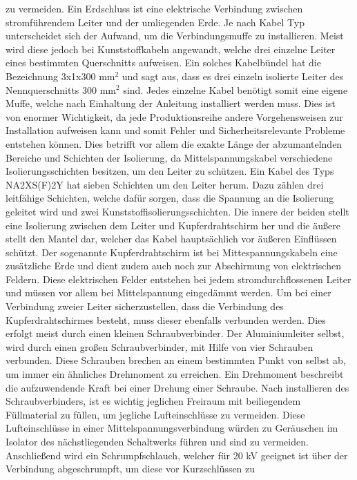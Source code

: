 zu vermeiden. Ein Erdschluss ist eine elektrische Verbindung zwischen stromführendem Leiter und der umliegenden Erde. Je nach Kabel Typ unterscheidet sich der 
Aufwand, um die Verbindungsmuffe zu installieren. Meist wird diese jedoch bei Kunststoffkabeln angewandt, welche drei einzelne Leiter eines bestimmten 
Querschnitts aufweisen. Ein solches Kabelbündel hat die Bezeichnung 3x1x300 mm$^2$ und sagt aus, dass es drei einzeln isolierte Leiter des Nennquerschnitts 
300 mm$^2$ sind. %
Jedes einzelne Kabel benötigt somit eine eigene Muffe, welche nach Einhaltung der Anleitung installiert werden muss. Dies ist von enormer Wichtigkeit, da jede 
Produktionsreihe andere Vorgehensweisen zur Installation aufweisen kann und somit Fehler und Sicherheitsrelevante Probleme entstehen können. Dies betrifft 
vor allem die exakte Länge der abzumantelnden Bereiche und Schichten der Isolierung, da Mittelspannungskabel verschiedene Isolierungsschichten besitzen, um 
den Leiter zu schützen. Ein Kabel des Typs NA2XS(F)2Y hat \zB sieben Schichten um den Leiter herum. Dazu zählen drei leitfähige Schichten, welche dafür 
sorgen, dass die Spannung an die Isolierung geleitet wird und zwei Kunststoffisolierungsschichten. Die innere der beiden stellt eine Isolierung zwischen dem 
Leiter und Kupferdrahtschirm her und die äußere stellt den Mantel dar, welcher das Kabel hauptsächlich vor äußeren Einflüssen schützt. Der sogenannte 
Kupferdrahtschirm ist bei Mittespannungskabeln eine zusätzliche Erde und dient zudem auch noch zur Abschirmung von elektrischen Feldern. \autocite{NKT_NA2XSF2Y}
Diese elektrischen Felder 
entstehen bei jedem stromdurchflossenen Leiter und müssen vor allem bei Mittelspannung eingedämmt werden. Um bei einer Verbindung zweier Leiter 
sicherzustellen, dass die Verbindung des Kupferdrahtschirmes besteht, muss dieser ebenfalls verbunden werden. Dies erfolgt meist durch einen kleinen 
Schraubverbinder. Der Aluminiumleiter selbst, wird durch einen großen Schraubverbinder, mit Hilfe von vier Schrauben verbunden. Diese Schrauben brechen an 
einem bestimmten Punkt von selbst ab, um immer ein ähnliches Drehmoment zu erreichen. Ein Drehmoment beschreibt die aufzuwendende Kraft bei einer Drehung 
einer Schraube. Nach installieren des Schraubverbinders, ist es wichtig jeglichen Freiraum mit beiliegendem Füllmaterial zu füllen, um jegliche 
Lufteinschlüsse zu vermeiden. Diese Lufteinschlüsse in einer Mittelspannungsverbindung würden zu Geräuschen im Isolator des nächstliegenden Schaltwerks führen 
und sind zu vermeiden. Anschließend wird ein Schrumpfschlauch, welcher für 20 kV geeignet ist über der Verbindung abgeschrumpft, um diese vor Kurzschlüssen zu 
